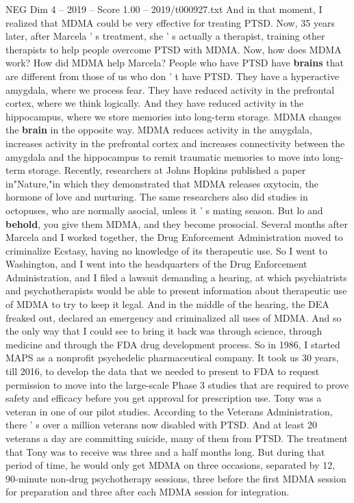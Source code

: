 \begin{textsample}{NEG Dim 4 – 2019 – Score 1.00 – 2019/t000927.txt}
And in that moment, I realized that MDMA could be very effective for treating PTSD.
Now, 35 years later, after Marcela ' s treatment, she ' s actually a therapist, training other therapists to help people overcome PTSD with MDMA.
Now, how does MDMA work?
How did MDMA help Marcela?
People who have PTSD have \textbf{brains} that are different from those of us who don ' t have PTSD.
They have a hyperactive amygdala, where we process fear.
They have reduced activity in the prefrontal cortex, where we think logically.
And they have reduced activity in the hippocampus, where we store memories into long-term storage.
MDMA changes the \textbf{brain} in the opposite way.
MDMA reduces activity in the amygdala, increases activity in the prefrontal cortex and increases connectivity between the amygdala and the hippocampus to remit traumatic memories to move into long-term storage.
Recently, researchers at Johns Hopkins published a paper in"Nature,"in which they demonstrated that MDMA releases oxytocin, the hormone of love and nurturing.
The same researchers also did studies in octopuses, who are normally asocial, unless it ' s mating season.
But lo and \textbf{behold}, you give them MDMA, and they become prosocial.
Several months after Marcela and I worked together, the Drug Enforcement Administration moved to criminalize Ecstasy, having no knowledge of its therapeutic use.
So I went to Washington, and I went into the headquarters of the Drug Enforcement Administration, and I filed a lawsuit demanding a hearing, at which psychiatrists and psychotherapists would be able to present information about therapeutic use of MDMA to try to keep it legal.
And in the middle of the hearing, the DEA freaked out, declared an emergency and criminalized all uses of MDMA.
And so the only way that I could see to bring it back was through science, through medicine and through the FDA drug development process.
So in 1986, I started MAPS as a nonprofit psychedelic pharmaceutical company.
It took us 30 years, till 2016, to develop the data that we needed to present to FDA to request permission to move into the large-scale Phase 3 studies that are required to prove safety and efficacy before you get approval for prescription use.
Tony was a veteran in one of our pilot studies.
According to the Veterans Administration, there ' s over a million veterans now disabled with PTSD.
And at least 20 veterans a day are committing suicide, many of them from PTSD.
The treatment that Tony was to receive was three and a half months long.
But during that period of time, he would only get MDMA on three occasions, separated by 12, 90-minute non-drug psychotherapy sessions, three before the first MDMA session for preparation and three after each MDMA session for integration.

\end{textsample}

